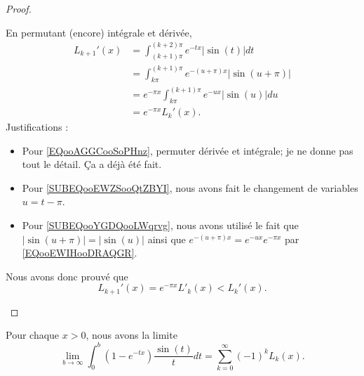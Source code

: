 \begin{proof}
\begin{subproof}
            En permutant (encore) intégrale et dérivée,
            \begin{subequations}
                \begin{align}
                    L_{k+1}'(x)&=\int_{(k+1)\pi}^{(k+2)\pi} e^{-tx}| \sin(t) |dt        \label{EQooAGGCooSoPHnz}\\
                    &=\int_{k\pi}^{(k+1)\pi} e^{-(u+\pi)x}| \sin(u+\pi) |       \label{SUBEQooEWZSooQtZBYI}\\
                    &= e^{-\pi x}\int_{k\pi}^{(k+1)\pi} e^{-ux}| \sin(u) |du    \label{SUBEQooYGDQooLWqrvg}\\
                    &= e^{-\pi x}L_k'(x).
                \end{align}
            \end{subequations}
            Justifications :
            \begin{itemize}
                \item Pour \eqref{EQooAGGCooSoPHnz}, permuter dérivée et intégrale; je ne donne pas tout le détail. Ça a déjà été fait.
                \item Pour \eqref{SUBEQooEWZSooQtZBYI}, nous avons fait le changement de variables \( u=t-\pi\).
                \item Pour \eqref{SUBEQooYGDQooLWqrvg}, nous avons utilisé le fait que \( | \sin(u+\pi) |=| \sin(u) |\) ainsi que \(  e^{-(u+\pi)x}= e^{-ux} e^{-\pi x}\) par \eqref{EQooEWIHooDRAQGR}.
            \end{itemize}
            Nous avons donc prouvé que
            \begin{equation}
                L_{k+1}'(x)= e^{-\pi x}L'_{k}(x)<L_k'(x).
            \end{equation}
    \end{subproof}
\end{proof}

\begin{lemma}       \label{LEMooSWFDooGLfwoD}
    Pour chaque \( x>0\), nous avons la limite
    \begin{equation}
        \lim_{b\to \infty} \int_0^{b}(1- e^{-tx})\frac{ \sin(t) }{ t }dt=\sum_{k=0}^{\infty}(-1)^kL_k(x).
    \end{equation}
\end{lemma}

